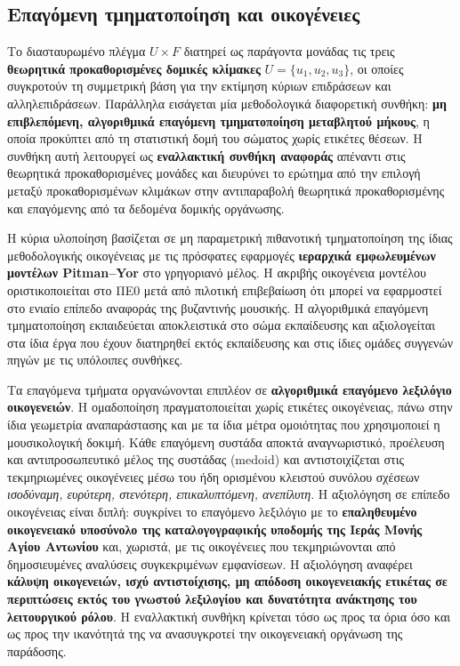 \documentclass[11pt,a4paper]{article}
\begin{document}
\subsection{Επαγόμενη τμηματοποίηση και οικογένειες}\label{app:repr-induced}

Το διασταυρωμένο πλέγμα \(U\times F\) διατηρεί ως παράγοντα μονάδας τις τρεις \textbf{θεωρητικά προκαθορισμένες δομικές κλίμακες} \(U=\{u_1,u_2,u_3\}\), οι οποίες συγκροτούν τη συμμετρική βάση για την εκτίμηση κύριων επιδράσεων και αλληλεπιδράσεων. Παράλληλα εισάγεται μία μεθοδολογικά διαφορετική συνθήκη: \textbf{μη επιβλεπόμενη, αλγοριθμικά επαγόμενη τμηματοποίηση μεταβλητού μήκους}, η οποία προκύπτει από τη στατιστική δομή του σώματος χωρίς ετικέτες θέσεων. Η συνθήκη αυτή λειτουργεί ως \textbf{εναλλακτική συνθήκη αναφοράς} απέναντι στις θεωρητικά προκαθορισμένες μονάδες και διευρύνει το ερώτημα από την επιλογή μεταξύ προκαθορισμένων κλιμάκων στην αντιπαραβολή θεωρητικά προκαθορισμένης και επαγόμενης από τα δεδομένα δομικής οργάνωσης.

Η κύρια υλοποίηση βασίζεται σε μη παραμετρική πιθανοτική τμηματοποίηση της ίδιας μεθοδολογικής οικογένειας με τις πρόσφατες εφαρμογές \textbf{ιεραρχικά εμφωλευμένων μοντέλων Pitman--Yor} στο γρηγοριανό μέλος. Η ακριβής οικογένεια μοντέλου οριστικοποιείται στο ΠΕ0 μετά από πιλοτική επιβεβαίωση ότι μπορεί να εφαρμοστεί στο ενιαίο επίπεδο αναφοράς της βυζαντινής μουσικής. Η αλγοριθμικά επαγόμενη τμηματοποίηση εκπαιδεύεται αποκλειστικά στο σώμα εκπαίδευσης και αξιολογείται στα ίδια έργα που έχουν διατηρηθεί εκτός εκπαίδευσης και στις ίδιες ομάδες συγγενών πηγών με τις υπόλοιπες συνθήκες.

Τα επαγόμενα τμήματα οργανώνονται επιπλέον σε \textbf{αλγοριθμικά επαγόμενο λεξιλόγιο οικογενειών}. Η ομαδοποίηση πραγματοποιείται χωρίς ετικέτες οικογένειας, πάνω στην ίδια γεωμετρία αναπαράστασης και με τα ίδια μέτρα ομοιότητας που χρησιμοποιεί η μουσικολογική δοκιμή. Κάθε επαγόμενη συστάδα αποκτά αναγνωριστικό, προέλευση και αντιπροσωπευτικό μέλος της συστάδας (medoid) και αντιστοιχίζεται στις τεκμηριωμένες οικογένειες μέσω του ήδη ορισμένου κλειστού συνόλου σχέσεων \emph{ισοδύναμη, ευρύτερη, στενότερη, επικαλυπτόμενη, ανεπίλυτη}. Η αξιολόγηση σε επίπεδο οικογένειας είναι διπλή: συγκρίνει το επαγόμενο λεξιλόγιο με το \textbf{επαληθευμένο οικογενειακό υποσύνολο της καταλογογραφικής υποδομής της Ιεράς Μονής Αγίου Αντωνίου} και, χωριστά, με τις οικογένειες που τεκμηριώνονται από δημοσιευμένες αναλύσεις συγκεκριμένων εμφανίσεων. Η αξιολόγηση αναφέρει \textbf{κάλυψη οικογενειών, ισχύ αντιστοίχισης, μη απόδοση οικογενειακής ετικέτας σε περιπτώσεις εκτός του γνωστού λεξιλογίου και δυνατότητα ανάκτησης του λειτουργικού ρόλου}. Η εναλλακτική συνθήκη κρίνεται τόσο ως προς τα όρια όσο και ως προς την ικανότητά της να ανασυγκροτεί την οικογενειακή οργάνωση της παράδοσης.
\end{document}
